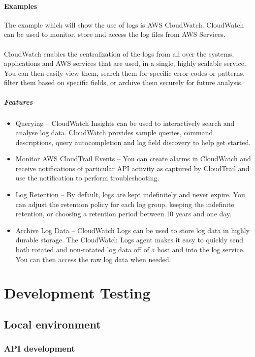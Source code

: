 \documentclass[10pt]{article}
\begin{document}
\paragraph{Examples}
The example which will show the use of logs is AWS CloudWatch. CloudWatch can be used to monitor, store and access the log files from AWS Services.
\\ \\
CloudWatch enables the centralization of the logs from all over the systems, applications and AWS services that are used, in a single, highly scalable service. You can then easily view them, search them for specific error codes or patterns, filter them based on specific fields, or archive them securely for future analysis. \cite{aws-cloudwatch}
\subparagraph{Features}
\begin{itemize}
	\item Querying – CloudWatch Insights can be used to interactively search and analyse log data. CloudWatch provides sample queries, command descriptions, query autocompletion and log field discovery to help get started. 
	\item Monitor AWS CloudTrail Events – You can create alarms in CloudWatch and receive notifications of particular API activity as captured by CloudTrail and use the notification to perform troubleshooting.
	\item Log Retention – By default, logs are kept indefinitely and never expire. You can adjust the retention policy for each log group, keeping the indefinite retention, or choosing a retention period between 10 years and one day.
	\item Archive Log Data – CloudWatch Logs can be used to store log data in highly durable storage. The CloudWatch Logs agent makes it easy to quickly send both rotated and non-rotated log data off of a host and into the log service. You can then access the raw log data when needed.
\end{itemize}


\newpage
\section{Development Testing}
\subsection{Local environment}
\subsubsection{API development}
\end{document}
